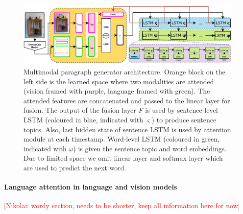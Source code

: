 \documentclass[11pt,a4paper]{article}
\newcommand{\kibitz}[2]{\ifnum\Comments=1\textcolor{#1}{#2}\fi}
\newcommand{\nikolai}[1]{\kibitz{red}      {[Nikolai: #1]}}
\begin{document}
\begin{figure}[h!]
  \includegraphics[width=\linewidth]{figures/model}
  \caption{Multimodal paragraph generator architecture.
  		Orange block on the left side is the learned space where two modalities are attended (vision framed with purple, language framed with green).
		The attended features are concatenated and passed to the linear layer for fusion.
		The output of the fusion layer \textit{F} is used by sentence-level LSTM (coloured in blue, indicated with $\varsigma$) to produce sentence topics.
		Also, last hidden state of sentence LSTM is used by attention module at each timestamp.
		Word-level LSTM (coloured in green, indicated with $\omega$) is given the sentence topic and word embeddings.
		Due to limited space we omit linear layer and softmax layer which are used to predict the next word.}
  \label{fig:model}
\end{figure}

\paragraph{Language attention in language and vision models}
\nikolai{wordy section, needs to be shorter, keep all information here for now}
\end{document}
